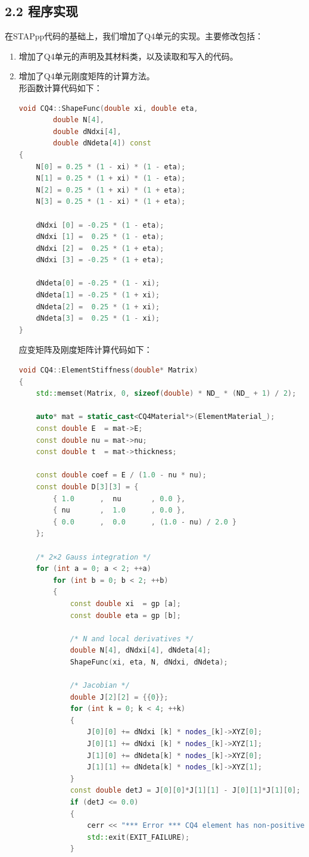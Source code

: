 \documentclass[12pt]{article}
\begin{document}
\subsection*{2.2 程序实现}
在STAPpp代码的基础上，我们增加了Q4单元的实现。主要修改包括：
\begin{enumerate}
    \item 增加了Q4单元的声明及其材料类，以及读取和写入的代码。
    \item 增加了Q4单元刚度矩阵的计算方法。\\
    形函数计算代码如下：
    \begin{lstlisting}[language=C++]
    void CQ4::ShapeFunc(double xi, double eta,
        double N[4],
        double dNdxi[4],
        double dNdeta[4]) const
{
    N[0] = 0.25 * (1 - xi) * (1 - eta);
    N[1] = 0.25 * (1 + xi) * (1 - eta);
    N[2] = 0.25 * (1 + xi) * (1 + eta);
    N[3] = 0.25 * (1 - xi) * (1 + eta);

    dNdxi [0] = -0.25 * (1 - eta);
    dNdxi [1] =  0.25 * (1 - eta);
    dNdxi [2] =  0.25 * (1 + eta);
    dNdxi [3] = -0.25 * (1 + eta);

    dNdeta[0] = -0.25 * (1 - xi);
    dNdeta[1] = -0.25 * (1 + xi);
    dNdeta[2] =  0.25 * (1 + xi);
    dNdeta[3] =  0.25 * (1 - xi);
}
    \end{lstlisting}
    应变矩阵及刚度矩阵计算代码如下：
    \begin{lstlisting}[language=C++]
void CQ4::ElementStiffness(double* Matrix)
{
    std::memset(Matrix, 0, sizeof(double) * ND_ * (ND_ + 1) / 2);

    auto* mat = static_cast<CQ4Material*>(ElementMaterial_);
    const double E  = mat->E;
    const double nu = mat->nu;
    const double t  = mat->thickness;

    const double coef = E / (1.0 - nu * nu);
    const double D[3][3] = {
        { 1.0      ,  nu       , 0.0 },
        { nu       ,  1.0      , 0.0 },
        { 0.0      ,  0.0      , (1.0 - nu) / 2.0 }
    };

    /* 2×2 Gauss integration */
    for (int a = 0; a < 2; ++a)
        for (int b = 0; b < 2; ++b)
        {
            const double xi  = gp [a];
            const double eta = gp [b];

            /* N and local derivatives */
            double N[4], dNdxi[4], dNdeta[4];
            ShapeFunc(xi, eta, N, dNdxi, dNdeta);

            /* Jacobian */
            double J[2][2] = {{0}};
            for (int k = 0; k < 4; ++k)
            {
                J[0][0] += dNdxi [k] * nodes_[k]->XYZ[0];
                J[0][1] += dNdxi [k] * nodes_[k]->XYZ[1];
                J[1][0] += dNdeta[k] * nodes_[k]->XYZ[0];
                J[1][1] += dNdeta[k] * nodes_[k]->XYZ[1];
            }
            const double detJ = J[0][0]*J[1][1] - J[0][1]*J[1][0];
            if (detJ <= 0.0)
            {
                cerr << "*** Error *** CQ4 element has non-positive Jacobian.\n";
                std::exit(EXIT_FAILURE);
            }


\end{lstlisting}
\end{enumerate}
\end{document}
